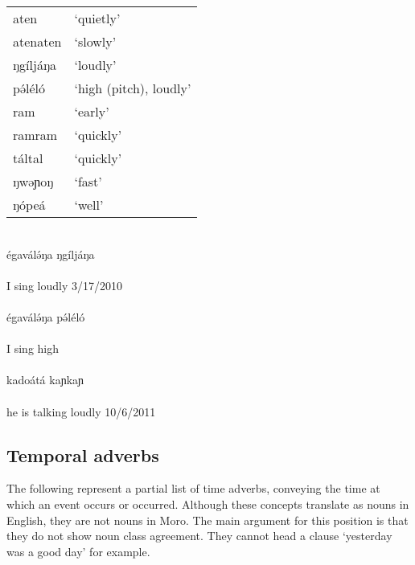 \begin{tabular}[t]{ll}
aten		&	‘quietly’\\
atenaten	&	‘slowly’\\
ŋgíljáŋa	&	‘loudly’\\
pə́léló		&	‘high (pitch), loudly’\\
ram			&	‘early’\\
ramram		&	‘quickly’\\
táltal		&	‘quickly’\\
ŋwəɲoŋ		&	‘fast’\\
ŋópeá		&	‘well’\\	
\end{tabular}
\vspace{8pt}
\\
\gll égaválə́ŋa ŋgíljáŋa\\
\\
\trans I sing loudly	\hfill	3/17/2010\\
\\
\gll égaválə́ŋa pə́léló	\\
\\
\trans	I sing high\\
\\
\gll kadoátá kaɲkaɲ	\\
\\
\trans he is talking loudly \hfill	10/6/2011\\

\subsection{Temporal adverbs}

The following represent a partial list of time adverbs, conveying the time at which an event occurs or occurred. Although these concepts translate as nouns in English, they are not nouns in Moro. The main argument for this position is that they do not show noun class agreement. They cannot head a clause ‘yesterday was a good day’ for example. \\


